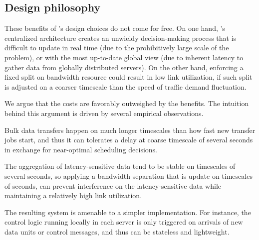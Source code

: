 \subsection{Design philosophy}

These benefits of \name's design choices do not come for free. 
On one hand, \name's centralized architecture creates an unwieldy 
decision-making process that is difficult to update in real time 
(due to the prohibitively large scale of the problem),
or with the most up-to-date global view (due to inherent latency
to gather data from globally distributed servers).
On the other hand, enforcing a fixed split on bandwidth resource
could result in low link utilization, if such split is adjusted on
a coarser timescale than the speed of traffic demand fluctuation.



We argue that the costs are favorably outweighed by the 
benefits. The intuition behind this argument 
is driven by several empirical observations. 
\begin{packedenumerate}
\item Bulk data transfers happen on much longer timescales than 
how fast new transfer jobs start, and thus it can tolerates a delay
at coarse timescale of several seconds in exchange for near-optimal 
scheduling decisions. 
\item The aggregation of latency-sensitive data tend to be stable 
on timescales of several seconds, so applying a bandwidth separation 
that is update on timescales of seconds, can prevent interference on 
the latency-sensitive data while maintaining a relatively 
high link utilization. 
\item The resulting system is amenable to a simpler implementation. 
For instance, the control logic running locally in each server
is only triggered on arrivals of new data units or control messages, 
and thus can be stateless and lightweight.
\end{packedenumerate}

